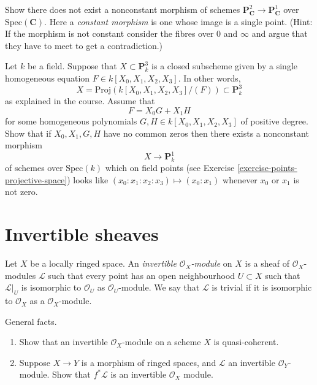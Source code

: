 \begin{exercise}
\label{exercise-no-nonconstant-morphism-proj}
Show there does not exist a nonconstant morphism of schemes
$\mathbf{P}^2_{\mathbf{C}} \to \mathbf{P}^1_{\mathbf{C}}$
over $\text{Spec}(\mathbf{C})$. Here a {\it constant morphism} is
one whose image is a single point.
(Hint: If the morphism is not constant consider the fibres over
$0$ and $\infty$ and argue that they have to meet to get a contradiction.)
\end{exercise}

\begin{exercise}
\label{exercise-nonconstant-morphism}
Let $k$ be a field.
Suppose that $X \subset \mathbf{P}^3_k$ is a closed subscheme
given by a single homogeneous equation $F \in k[X_0, X_1, X_2, X_3]$.
In other words,
$$
X = \text{Proj}(k[X_0, X_1, X_2, X_3]/(F)) \subset \mathbf{P}^3_k
$$
as explained in the course. Assume that
$$
F = X_0 G + X_1 H
$$
for some homogeneous polynomials $G, H \in k[X_0, X_1, X_2, X_3]$
of positive degree. Show that if $X_0, X_1, G, H$ have no common zeros
then there exists a nonconstant morphism
$$
X \longrightarrow \mathbf{P}^1_k
$$
of schemes over $\text{Spec}(k)$
which on field points (see Exercise \ref{exercise-points-projective-space})
looks like $(x_0 : x_1 : x_2 : x_3) \mapsto (x_0 : x_1)$ whenever
$x_0$ or $x_1$ is not zero.
\end{exercise}





\section{Invertible sheaves}
\label{section-invertible-sheaves}

\begin{definition}
\label{definition-invertible-sheaf}
Let $X$ be a locally ringed space.
An {\it invertible ${\mathcal O}_X$-module} on $X$
is a sheaf of ${\mathcal O}_X$-modules ${\mathcal L}$ such that every point
has an open neighbourhood $U \subset X$ such that ${\mathcal L}|_U$
is isomorphic to ${\mathcal O}_U$ as ${\mathcal O}_U$-module.
We say that ${\mathcal L}$ is trivial if it is isomorphic to
${\mathcal O}_X$ as a ${\mathcal O}_X$-module.
\end{definition}

\begin{exercise}
\label{exercise-general-facts-invertible}
General facts.
\begin{enumerate}
\item Show that an invertible ${\mathcal O}_X$-module on
a scheme $X$ is quasi-coherent.
\item Suppose $X\to Y$ is a morphism of ringed spaces,
and ${\mathcal L}$ an invertible ${\mathcal O}_Y$-module.
Show that $f^\ast {\mathcal L}$ is an invertible ${\mathcal O}_X$ module.
\end{enumerate}
\end{exercise}

